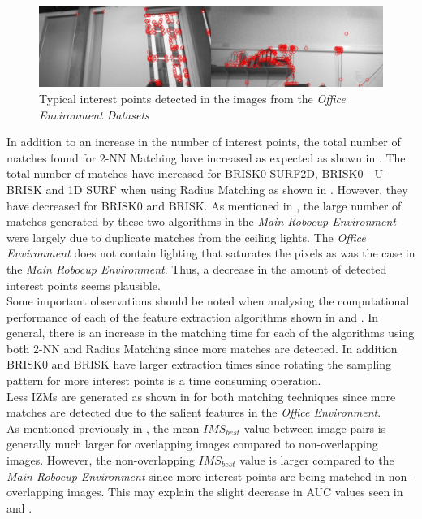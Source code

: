\documentclass[11pt]{report}
\begin{document}
\begin{figure}
  \centering
    \includegraphics[width=1.0\textwidth]{../Drawings/Matching/dataset2_interestPoints.jpg}
    \caption{Typical interest points detected in the images from the \textit{Office Environment Datasets}} 
    \label{fig:oe_interestPoints}
\end{figure}


In addition to an increase in the number of interest points, the total number of matches found for 2-NN Matching have increased as expected as shown in . The total number of matches have increased for BRISK0-SURF2D, BRISK0 - U-BRISK and 1D SURF when using Radius Matching as shown in . However, they have decreased for BRISK0 and BRISK. As mentioned in , the large number of matches generated by these two algorithms in the \textit{Main Robocup Environment} were largely due to duplicate matches from the ceiling lights. The \textit{Office Environment} does not contain lighting that saturates the pixels as was the case in the \textit{Main Robocup Environment}. Thus, a decrease in the amount of detected interest points seems plausible.\\


Some important observations should be noted when analysing the computational performance of each of the feature extraction algorithms shown in  and . In general, there is an increase in the matching time for each of the algorithms using both 2-NN and Radius Matching since more matches are detected. In addition BRISK0 and BRISK have larger extraction times since rotating the sampling pattern for more interest points is a time consuming operation.\\

Less IZMs are generated as shown in  for both matching techniques since more matches are detected due to the salient features in the \textit{Office Environment}. \\

As mentioned previously in , the mean $IMS_{best}$ value between image pairs is generally much larger for overlapping images compared to non-overlapping images. However, the non-overlapping $IMS_{best}$ value is larger compared to the \textit{Main Robocup Environment} since more interest points are being matched in non-overlapping images. This may explain the slight decrease in AUC values seen in  and  .\\
\end{document}
